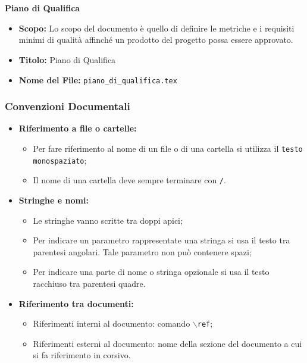 \documentclass[a4paper, 12pt]{article}
\begin{document}
\paragraph{}\\
\textbf{Piano di Qualifica}
\begin{itemize}
    \item \textbf{Scopo:} Lo scopo del documento è quello di definire le metriche e i requisiti minimi di qualità affinché un prodotto del progetto possa essere approvato.
    \item \textbf{Titolo:} Piano di Qualifica
    \item \textbf{Nome del File:} \texttt{piano\_di\_qualifica.tex}
\end{itemize}
\subsubsection{Convenzioni Documentali}
\begin{itemize}
    \item \textbf{Riferimento a file o cartelle:}
    \begin{itemize}
        \item Per fare riferimento al nome di un file o di una cartella si utilizza il \texttt{testo monospaziato};
        \item Il nome di una cartella deve sempre terminare con \texttt{/}.
    \end{itemize}
    \item \textbf{Stringhe e nomi:}
    \begin{itemize}
        \item Le stringhe vanno scritte tra doppi apici;
        \item Per indicare un parametro rappresentate una stringa si usa il testo tra parentesi angolari. Tale parametro non può contenere spazi;
        \item Per indicare una parte di nome o stringa opzionale si usa il testo racchiuso tra parentesi quadre.
    \end{itemize}
    \item \textbf{Riferimento tra documenti:}
    \begin{itemize}
        \item Riferimenti interni al documento: comando \texttt{$\backslash$ref};
        \item Riferimenti esterni al documento: nome della sezione del documento a cui si fa riferimento in corsivo.
    \end{itemize}
\end{itemize}
\end{document}
